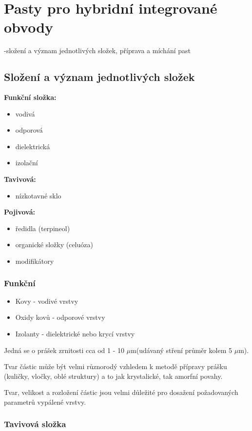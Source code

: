 \section{Pasty pro hybridní integrované obvody}
-složení a význam jednotlivých složek, příprava a míchání past

\subsection{Složení a význam jednotlivých složek}
\textbf{Funkční složka:}
\begin{itemize}
\item vodivá
\item odporová
\item dielektrická
\item izolační
\end{itemize}

\textbf{Tavivová:}
\begin{itemize}
\item nízkotavné sklo
\end{itemize}

\textbf{Pojivová:}
\begin{itemize}
\item ředidla (terpineol)
\item organické složky (celuóza)
\item modifikátory
\end{itemize}

\subsubsection{Funkční}
\begin{itemize}
\item Kovy - vodivé vrstvy
\item Oxidy kovů - odporové vrstvy
\item Izolanty - dielektrické nebo krycí vrstvy
\end{itemize}

Jedná se o prášek zrnitosti cca od 1 - 10 $\mu$m(udávaný stření průměr kolem 5 $\mu$m).

Tvar částic může být velmi různorodý vzhledem k metodě
přípravy prášku (kuličky, vločky, oblé struktury) a to jak
krystalické, tak amorfní povahy.

Tvar, velikost a rozložení částic jsou velmi důležité pro
dosažení požadovaných parametrů vypálené vrstvy.

\subsubsection{Tavivová složka}

